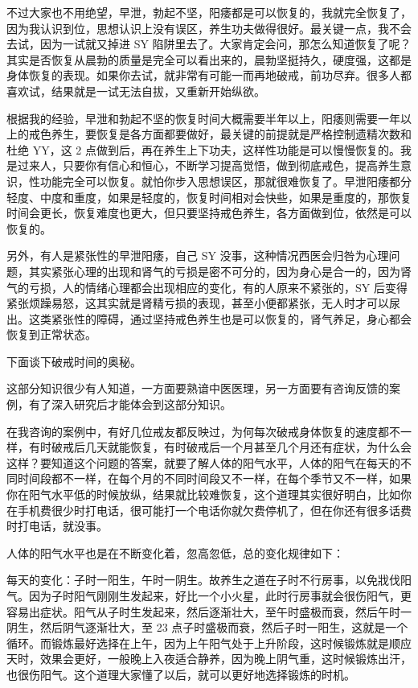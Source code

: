 \documentclass{ctexart}
\begin{document}
不过大家也不用绝望，早泄，勃起不坚，阳痿都是可以恢复的，我就完全恢复了，因为我认识到位，思想认识上没有误区，养生功夫做得很好。最关键一点，我不会去试，因为一试就又掉进 SY 陷阱里去了。大家肯定会问，那怎么知道恢复了呢？其实是否恢复从晨勃的质量是完全可以看出来的，晨勃坚挺持久，硬度强，这都是身体恢复的表现。如果你去试，就非常有可能一而再地破戒，前功尽弃。很多人都喜欢试，结果就是一试无法自拔，又重新开始纵欲。

根据我的经验，早泄和勃起不坚的恢复时间大概需要半年以上，阳痿则需要一年以上的戒色养生，要恢复是各方面都要做好，最关键的前提就是严格控制遗精次数和杜绝 YY，这 2 点做到后，再在养生上下功夫，这样性功能是可以慢慢恢复的。我是过来人，只要你有信心和恒心，不断学习提高觉悟，做到彻底戒色，提高养生意识，性功能完全可以恢复。就怕你步入思想误区，那就很难恢复了。早泄阳痿都分轻度、中度和重度，如果是轻度的，恢复时间相对会快些，如果是重度的，那恢复时间会更长，恢复难度也更大，但只要坚持戒色养生，各方面做到位，依然是可以恢复的。

另外，有人是紧张性的早泄阳痿，自己 SY 没事，这种情况西医会归咎为心理问题，其实紧张心理的出现和肾气的亏损是密不可分的，因为身心是合一的，因为肾气的亏损，人的情绪心理都会出现相应的变化，有的人原来不紧张的，SY 后变得紧张烦躁易怒，这其实就是肾精亏损的表现，甚至小便都紧张，无人时才可以尿出。这类紧张性的障碍，通过坚持戒色养生也是可以恢复的，肾气养足，身心都会恢复到正常状态。

下面谈下破戒时间的奥秘。

这部分知识很少有人知道，一方面要熟谙中医医理，另一方面要有咨询反馈的案例，有了深入研究后才能体会到这部分知识。

在我咨询的案例中，有好几位戒友都反映过，为何每次破戒身体恢复的速度都不一样，有时破戒后几天就能恢复，有时破戒后一个月甚至几个月还有症状，为什么会这样？要知道这个问题的答案，就要了解人体的阳气水平，人体的阳气在每天的不同时间段都不一样，在每个月的不同时间段又不一样，在每个季节又不一样，如果你在阳气水平低的时候放纵，结果就比较难恢复，这个道理其实很好明白，比如你在手机费很少时打电话，很可能打一个电话你就欠费停机了，但在你还有很多话费时打电话，就没事。

人体的阳气水平也是在不断变化着，忽高忽低，总的变化规律如下：

每天的变化：子时一阳生，午时一阴生。故养生之道在子时不行房事，以免戕伐阳气。因为子时阳气刚刚生发起来，好比一个小火星，此时行房事就会很伤阳气，更容易出症状。阳气从子时生发起来，然后逐渐壮大，至午时盛极而衰，然后午时一阴生，然后阴气逐渐壮大，至 23 点子时盛极而衰，然后子时一阳生，这就是一个循环。而锻炼最好选择在上午，因为上午阳气处于上升阶段，这时候锻炼就是顺应天时，效果会更好，一般晚上入夜适合静养，因为晚上阴气重，这时候锻炼出汗，也很伤阳气。这个道理大家懂了以后，就可以更好地选择锻炼的时机。
\end{document}
